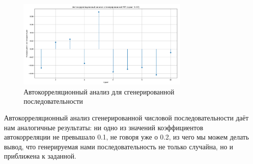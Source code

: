 \begin{figure}[H]
	\centering
	\includegraphics[width=0.75\textwidth]{data/auto_corellation-2.png}
	\caption{Автокорреляционный анализ для сгенерированной последовательности}
\end{figure}

Автокорреляционный анализ сгенерированной числовой последовательности даёт нам аналогичные результаты: ни одно из
значений коэффициентов автокорреляции не превышало 0.1, не говоря уже о 0.2, из чего мы можем делать вывод, что
генерируемая нами последовательность не только случайна, но и приближена к заданной.
